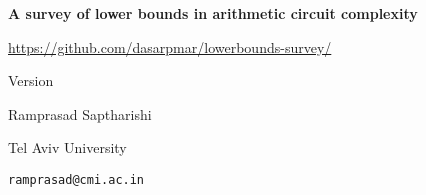 \documentclass[12pt]{report}
\begin{document}
\begin{titlepage}
  \vspace*{4cm}
  \begin{center}
    {\Huge {\bf A survey of lower bounds in arithmetic circuit complexity}}
  
    \vspace*{2cm}

    {\large \url{https://github.com/dasarpmar/lowerbounds-survey/}}
    
    {\large Version \currentversion}
    
    {}

    \vfill
    
    {\Large Ramprasad Saptharishi}

    {\large Tel Aviv University}

    {\large \texttt{ramprasad@cmi.ac.in}}
    
    \ccbyncsa
\end{center}

\end{titlepage}


\end{document}
